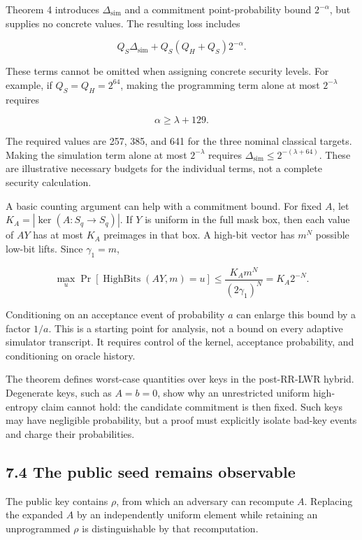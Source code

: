 \documentclass[
  american,
  10pt,
  a4paper,
]{article}
\begin{document}
Theorem 4 introduces \(\Delta_{\mathrm{sim}}\) and a commitment
point-probability bound \(2^{-\alpha}\), but supplies no concrete
values. The resulting loss includes

\[
Q_S\Delta_{\mathrm{sim}}+Q_S(Q_H+Q_S)2^{-\alpha}.
\]

These terms cannot be omitted when assigning concrete security levels.
For example, if \(Q_S=Q_H=2^{64}\), making the programming term alone at
most \(2^{-\lambda}\) requires

\[
\alpha\geq\lambda+129.
\]

The required values are 257, 385, and 641 for the three nominal
classical targets. Making the simulation term alone at most
\(2^{-\lambda}\) requires
\(\Delta_{\mathrm{sim}}\leq2^{-(\lambda+64)}\). These are illustrative
necessary budgets for the individual terms, not a complete security
calculation.

A basic counting argument can help with a commitment bound. For fixed
\(A\), let \(K_A=|\ker(A:S_q\to S_q)|\). If \(Y\) is uniform in the full
mask box, then each value of \(AY\) has at most \(K_A\) preimages in
that box. A high-bit vector has \(m^N\) possible low-bit lifts. Since
\(\gamma_1=m\),

\[
\max_u\Pr[\operatorname{HighBits}(AY,m)=u]
\leq\frac{K_A m^N}{(2\gamma_1)^N}
=K_A2^{-N}.
\]

Conditioning on an acceptance event of probability \(a\) can enlarge
this bound by a factor \(1/a\). This is a starting point for analysis,
not a bound on every adaptive simulator transcript. It requires control
of the kernel, acceptance probability, and conditioning on oracle
history.

The theorem defines worst-case quantities over keys in the post-RR-LWR
hybrid. Degenerate keys, such as \(A=b=0\), show why an unrestricted
uniform high-entropy claim cannot hold: the candidate commitment is then
fixed. Such keys may have negligible probability, but a proof must
explicitly isolate bad-key events and charge their probabilities.

\subsection{7.4 The public seed remains
observable}\label{the-public-seed-remains-observable}

The public key contains \(\rho\), from which an adversary can recompute
\(A\). Replacing the expanded \(A\) by an independently uniform element
while retaining an unprogrammed \(\rho\) is distinguishable by that
recomputation.
\end{document}
